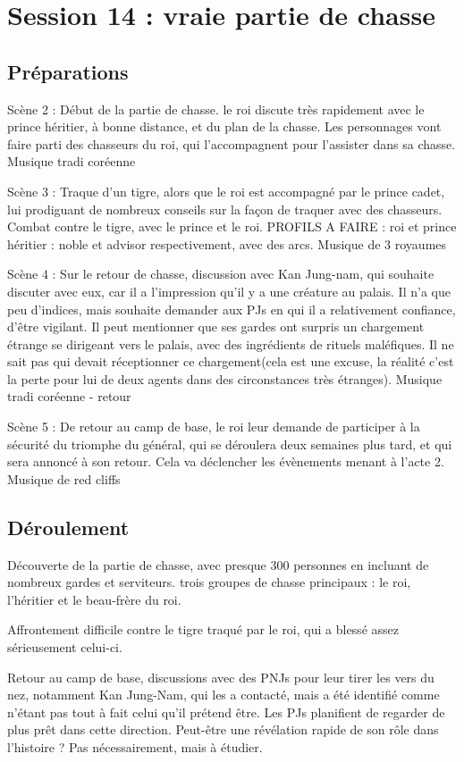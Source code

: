 \documentclass[10pt,a4paper]{book}
\begin{document}
\section{Session 14 : vraie partie de chasse}
\subsection{Préparations}
Scène 2 : Début de la partie de chasse. le roi discute très rapidement avec le prince héritier, à bonne distance, et du plan de la chasse. Les personnages vont faire parti des chasseurs du roi, qui l'accompagnent pour l'assister dans sa chasse. Musique tradi coréenne

Scène 3 : Traque d'un tigre, alors que le roi est accompagné par le prince cadet, lui prodiguant de nombreux conseils sur la façon de traquer avec des chasseurs. Combat contre le tigre, avec le prince et le roi. PROFILS A FAIRE : roi et prince héritier : noble et advisor respectivement, avec des arcs. Musique de 3 royaumes

Scène 4 : Sur le retour de chasse, discussion avec Kan Jung-nam, qui souhaite discuter avec eux, car il a l'impression qu'il y a une créature au palais. Il n'a que peu d'indices, mais souhaite demander aux PJs en qui il a relativement confiance, d'être vigilant. Il peut mentionner que ses gardes ont surpris un chargement étrange se dirigeant vers le palais, avec des ingrédients de rituels maléfiques. Il ne sait pas qui devait réceptionner ce chargement(cela est une excuse, la réalité c'est la perte pour lui de deux agents dans des circonstances très étranges). Musique tradi coréenne - retour

Scène 5 : De retour au camp de base, le roi leur demande de participer à la sécurité du triomphe du général, qui se déroulera deux semaines plus tard, et qui sera annoncé à son retour. Cela va déclencher les évènements menant à l'acte 2. Musique de red cliffs
\subsection{Déroulement}
Découverte de la partie de chasse, avec presque 300 personnes en incluant de nombreux gardes et serviteurs. trois groupes de chasse principaux : le roi, l'héritier et le beau-frère du roi. 

Affrontement difficile contre le tigre traqué par le roi, qui a blessé assez sérieusement celui-ci.

Retour au camp de base, discussions avec des PNJs pour leur tirer les vers du nez, notamment Kan Jung-Nam, qui les a contacté, mais a été identifié comme n'étant pas tout à fait celui qu'il prétend être. Les PJs planifient de regarder de plus prêt dans cette direction. Peut-être une révélation rapide de son rôle dans l'histoire ? Pas nécessairement, mais à étudier.
\end{document}
